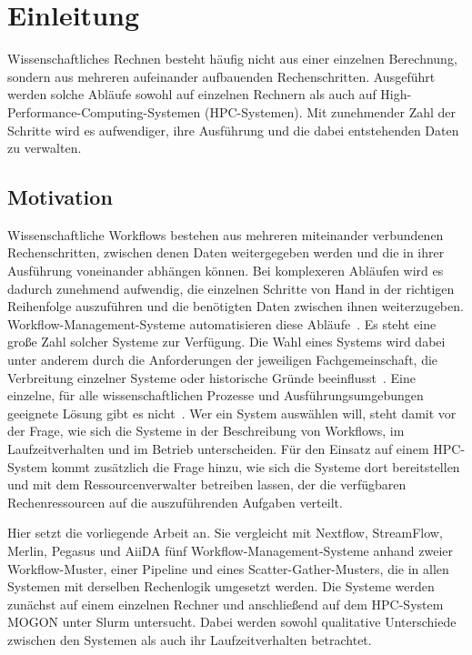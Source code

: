 \chapter{Einleitung}
\label{sec:intro}

Wissenschaftliches Rechnen besteht häufig nicht aus einer einzelnen
Berechnung, sondern aus mehreren aufeinander aufbauenden
Rechenschritten. Ausgeführt werden solche Abläufe sowohl auf einzelnen Rechnern als auch auf High-Performance-Computing-Systemen (HPC-Systemen). Mit zunehmender Zahl der Schritte wird es aufwendiger, ihre Ausführung und die dabei entstehenden Daten zu verwalten.

\section{Motivation}
\label{sec:intro:motivation}
Wissenschaftliche Workflows bestehen aus mehreren miteinander
verbundenen Rechenschritten, zwischen denen Daten weitergegeben
werden und die in ihrer Ausführung voneinander abhängen können.
Bei komplexeren Abläufen wird es dadurch zunehmend aufwendig, die
einzelnen Schritte von Hand in der richtigen Reihenfolge
auszuführen und die benötigten Daten zwischen ihnen weiterzugeben.
Workflow-Management-Systeme automatisieren diese Abläufe~\cite[S.~28\,f.]{badia2017workflows}\cite[S.~2]{suter2026terminology}.
Es steht eine große Zahl solcher Systeme zur Verfügung. Die Wahl
eines Systems wird dabei unter anderem durch die Anforderungen der
jeweiligen Fachgemeinschaft, die Verbreitung einzelner Systeme
oder historische Gründe beeinflusst~\cite[S.~28]{badia2017workflows}. Eine einzelne, für alle wissenschaftlichen Prozesse und Ausführungsumgebungen geeignete Lösung gibt es nicht~\cite[S.~2]{suter2026terminology}. Wer ein System auswählen will, steht damit vor der Frage, wie sich die Systeme in der
Beschreibung von Workflows, im Laufzeitverhalten und im Betrieb
unterscheiden. Für den Einsatz auf einem HPC-System kommt zusätzlich die Frage hinzu, wie sich die Systeme dort bereitstellen und mit dem
Ressourcenverwalter betreiben lassen, der die verfügbaren
Rechenressourcen auf die auszuführenden Aufgaben verteilt.

Hier setzt die vorliegende Arbeit an. Sie vergleicht mit Nextflow,
StreamFlow, Merlin, Pegasus und AiiDA fünf
Workflow-Management-Systeme anhand zweier Workflow-Muster, einer
Pipeline und eines Scatter-Gather-Musters, die in allen Systemen
mit derselben Rechenlogik umgesetzt werden. Die Systeme werden
zunächst auf einem einzelnen Rechner und anschließend auf dem
HPC-System MOGON unter Slurm untersucht. Dabei werden sowohl
qualitative Unterschiede zwischen den Systemen als auch ihr
Laufzeitverhalten betrachtet.


